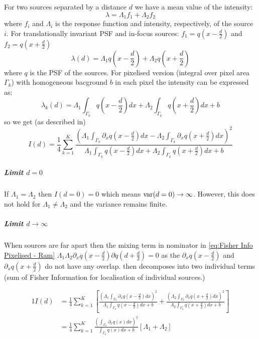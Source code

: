 For two sources separated by a distance $d$ we have a mean value of the intensity:
%
\begin{equation}
	\lambda=\Lambda_1f_1+\Lambda_2f_2
\end{equation}
%
where $f_i$ and $\Lambda_i$ is the response function and intensity, respectively, of the source $i$. For translationally invariant PSF and in-focus sources: $f_1=q(x-\frac{d}{2})$ and $f_2=q(x+\frac{d}{2})$
%
\begin{equation}
	\lambda(d)=\Lambda_1q(x-\frac{d}{2})+\Lambda_2q(x+\frac{d}{2})
\end{equation}
%
where $q$ is the PSF of the sources. For pixelised version (integral over pixel area $\Gamma_k$) with homogeneous bacground $b$ in each pixel the intensity can be expressed as:
%
\begin{equation}
	\lambda_k(d)=\Lambda_1\int_{\Gamma_k}q(x-\frac{d}{2})dx+\Lambda_2\int_{\Gamma_k}q(x+\frac{d}{2})dx+b
\end{equation}
%
so we get (as described in\cite{Ram2006})
%
\begin{equation}
	I(d)=\frac{1}{4}\sum_{k=1}^K\frac{\left(\Lambda_1\int_{\Gamma_k}\partial_{x}q(x-\frac{d}{2})dx-\Lambda_2\int_{\Gamma_k}\partial_{x}q(x+\frac{d}{2})dx\right)^2}{\Lambda_1\int_{\Gamma_k}q(x-\frac{d}{2})dx+\Lambda_2\int_{\Gamma_k}q(x+\frac{d}{2})dx+b}
	\label{eq:Fisher Info Pixelised - Ram}
\end{equation}


\subparagraph*{Limit $d=0$}
If $\Lambda_1=\Lambda_2$ then $I(d=0)=0$ which means $\mathrm{var}(d=0)\rightarrow\infty$. However, this does not hold for $\Lambda_1\neq\Lambda_2$ and the variance remains finite.

\subparagraph*{Limit $d\rightarrow\infty$}
When sources are far apart then the mixing term in nominator in \autoref{eq:Fisher Info Pixelised - Ram} $\Lambda_1\Lambda_2\partial_{x}q(x-\frac{d}{2})\partial q(d+\frac{d}{2})=0$ as the $\partial_{x}q(x-\frac{d}{2})$ and $\partial_{x}q(x+\frac{d}{2})$ do not have any overlap.  then decomposes into two individual terms (sum of Fisher Information for localisation of individual sources.) 

\begin{alignat*}{1}
	I(d) 
	& =\frac{1}{4}\sum_{k=1}^K\left[\frac{\left(\Lambda_1\int_{\Gamma_k}\partial_{x}q(x-\frac{d}{2})dx\right)^2}{\Lambda_1\int_{\Gamma_k}q(x-\frac{d}{2})dx+b}+\frac{\left(\Lambda_2\int_{\Gamma_k}\partial_{x}q(x+\frac{d}{2})dx\right)^2}{\Lambda_2\int_{\Gamma_k}q(x+\frac{d}{2})dx+b}\right]\\
 	& =\frac{1}{4}\sum_{k=1}^K\frac{\left(\int_{\Gamma_k}\partial_{x}q(x)dx\right)^2}{\int_{\Gamma_k}q(x)dx+b}\left[\Lambda_1+\Lambda_2\right]
\end{alignat*}

